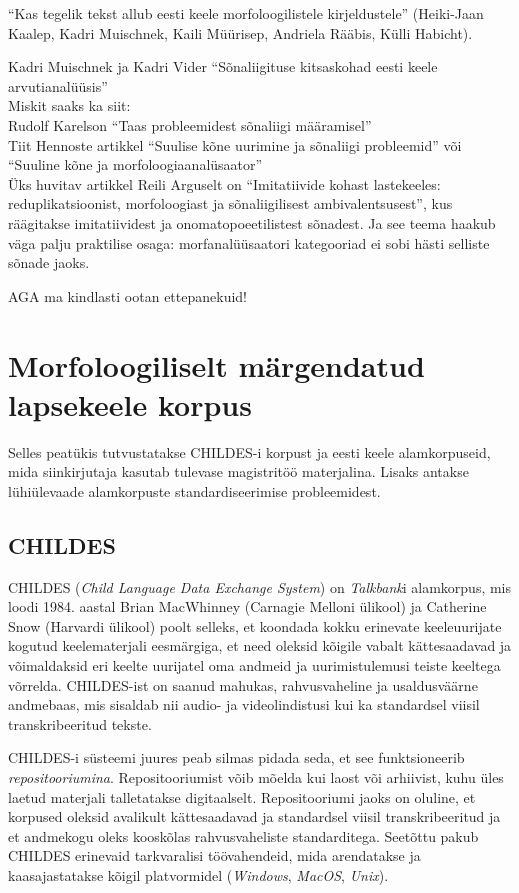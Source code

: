 \documentclass[12pt]{article}
\begin{document}
``Kas tegelik tekst allub eesti keele morfoloogilistele kirjeldustele'' (Heiki-Jaan Kaalep, Kadri Muischnek, Kaili Müürisep, Andriela Rääbis, Külli Habicht).

Kadri Muischnek ja Kadri Vider ``Sõnaliigituse kitsaskohad eesti keele arvutianalüüsis''\\
Miskit saaks ka siit:\\
Rudolf Karelson ``Taas probleemidest sõnaliigi määramisel''\\
Tiit Hennoste artikkel ``Suulise kõne uurimine ja sõnaliigi probleemid'' või ``Suuline kõne ja morfoloogiaanalüsaator''\\ 

Üks huvitav artikkel Reili Arguselt on ``Imitatiivide kohast lastekeeles: reduplikatsioonist, morfoloogiast ja sõnaliigilisest ambivalentsusest'', kus räägitakse imitatiividest ja onomatopoeetilistest sõnadest. Ja see teema haakub väga palju praktilise osaga: morfanalüüsaatori kategooriad ei sobi hästi selliste sõnade jaoks.

AGA ma kindlasti ootan ettepanekuid!



\newpage
\section{Morfoloogiliselt märgendatud lapsekeele korpus}

Selles peatükis tutvustatakse CHILDES-i korpust ja eesti keele alamkorpuseid, mida siinkirjutaja kasutab tulevase magistritöö materjalina. Lisaks antakse lühiülevaade alamkorpuste standardiseerimise probleemidest.

\subsection{CHILDES}
CHILDES (\emph{Child Language Data Exchange System}) on \emph{Talkbank}i alamkorpus, mis loodi 1984. aastal Brian MacWhinney (Carnagie Melloni ülikool) ja Catherine Snow (Harvardi ülikool) poolt selleks, et koondada kokku erinevate keeleuurijate kogutud keelematerjali eesmärgiga, et need oleksid kõigile vabalt kättesaadavad ja võimaldaksid eri keelte uurijatel oma andmeid ja uurimistulemusi teiste keeltega võrrelda. CHILDES-ist on saanud mahukas, rahvusvaheline ja usaldusväärne andmebaas, mis sisaldab nii audio- ja videolindistusi kui ka standardsel viisil transkribeeritud tekste. \citep[1]{Gillis}

CHILDES-i süsteemi juures peab silmas pidada seda, et see funktsioneerib \emph{repositooriumina}. Repositooriumist võib mõelda kui laost või arhiivist, kuhu üles laetud materjali talletatakse digitaalselt. Repositooriumi jaoks on oluline, et korpused oleksid avalikult kättesaadavad ja standardsel viisil transkribeeritud ja et andmekogu oleks kooskõlas rahvusvaheliste standarditega. Seetõttu pakub CHILDES erinevaid tarkvaralisi töövahendeid, mida arendatakse ja kaasajastatakse kõigil platvormidel (\emph{Windows}, \emph{MacOS}, \emph{Unix}). \citep[1]{Gillis}
\end{document}
